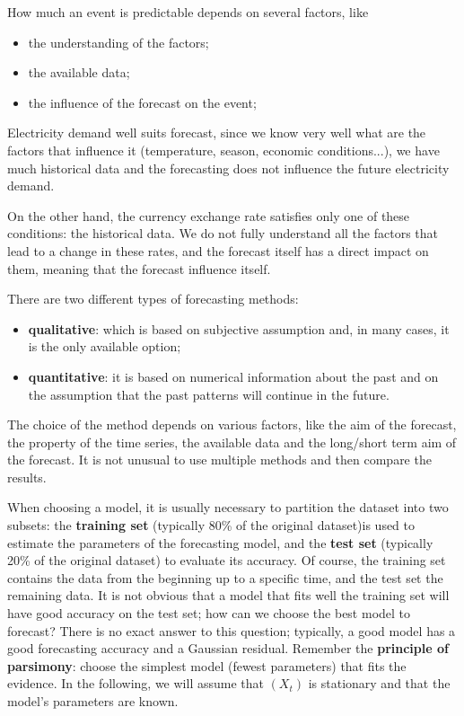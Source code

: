 How much an event is predictable depends on several factors, like
\begin{itemize}
    \item the understanding of the factors;
    \item the available data;
    \item the influence of the forecast on the event;
\end{itemize}

\begin{example}
    Electricity demand well suits forecast, since we know very well what are the factors that influence it (temperature, season, economic conditions...), we have much historical data and the forecasting does not influence the future electricity demand.
    
    On the other hand, the currency exchange rate satisfies only one of these conditions: the historical data. We do not fully understand all the factors that lead to a change in these rates, and the forecast itself has a direct impact on them, meaning that the forecast influence itself.
\end{example}

There are two different types of forecasting methods:
\begin{itemize}
    \item \textbf{qualitative}: which is based on subjective assumption and, in many cases, it is the only available option;
    \item \textbf{quantitative}: it is based on numerical information about the past and on the assumption that the past patterns will continue in the future.
\end{itemize}
The choice of the method depends on various factors, like the aim of the forecast, the property of the time series, the available data and the long/short term aim of the forecast. It is not unusual to use multiple methods and then compare the results. 

When choosing a model, it is usually necessary to partition the dataset into two subsets: the \textbf{training set} (typically 80\% of the original dataset)is used to estimate the parameters of the forecasting model, and the \textbf{test set} (typically 20\% of the original dataset) to evaluate its accuracy. Of course, the training set contains the data from the beginning up to a specific time, and the test set the remaining data. It is not obvious that a model that fits well the training set will have good accuracy on the test set; how can we choose the best model to forecast? There is no exact answer to this question; typically, a good model has a good forecasting accuracy and a Gaussian residual. Remember the \textbf{principle of parsimony}: choose the simplest model (fewest parameters) that fits the evidence. In the following, we will assume that $(X_t)$ is stationary and that the model's parameters are known.

